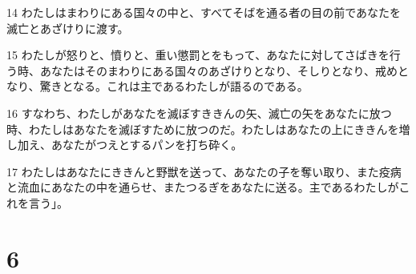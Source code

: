 \par 14 わたしはまわりにある国々の中と、すべてそばを通る者の目の前であなたを滅亡とあざけりに渡す。
\par 15 わたしが怒りと、憤りと、重い懲罰とをもって、あなたに対してさばきを行う時、あなたはそのまわりにある国々のあざけりとなり、そしりとなり、戒めとなり、驚きとなる。これは主であるわたしが語るのである。
\par 16 すなわち、わたしがあなたを滅ぼすききんの矢、滅亡の矢をあなたに放つ時、わたしはあなたを滅ぼすために放つのだ。わたしはあなたの上にききんを増し加え、あなたがつえとするパンを打ち砕く。
\par 17 わたしはあなたにききんと野獣を送って、あなたの子を奪い取り、また疫病と流血にあなたの中を通らせ、またつるぎをあなたに送る。主であるわたしがこれを言う」。

\chapter{6}

